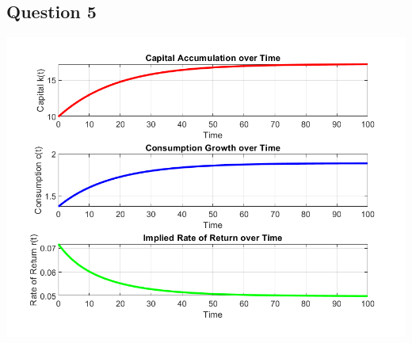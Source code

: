 \documentclass{article}
\begin{document}
\subsection*{Question 5}
\includegraphics[width=\textwidth]{homework/Solutions/pset2.png}
\end{document}
